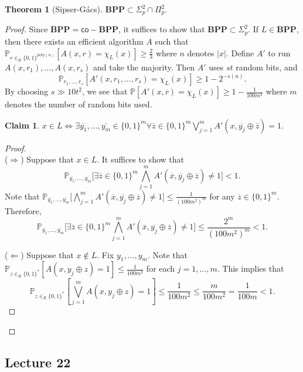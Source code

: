 \documentclass[10pt,letterpaper,cm]{nupset}
\theoremstyle{definition}
\theoremstyle{theorem}
\newtheorem{theorem}[definition]{Theorem}
\newtheorem*{claim}{Claim}
\theoremstyle{remark}
\newcommand{\1}{\mathbf{1}}
\newcommand{\0}{\vec 0}
\begin{document}
\begin{theorem}[Sipser-G\'acs]
$\mathbf{BPP} \subset \Sigma^2_p \cap \Pi^2_p$.
\end{theorem}
\begin{proof}
Since $\mathbf{BPP} = \mathsf{co}{-}\mathbf{BPP}$, it suffices to show that $\mathbf{BPP} \subset \Sigma^2_p$. If $L \in \mathbf{BPP}$, then there exists an efficient algorithm $A$ such that $\mathbb{P}_{r \in_R \{0,1\}^{\text{poly}(n)}}[A(x,r) = \chi_L(x)] \geq \frac{2}{3}$ where $n$ denotes $|x|$. Define $A'$ to run $A(x, r_1), \ldots, A(x, r_s)$ and take the majority. Then $A'$ uses $st$ random bits, and $$\mathbb{P}_{r_1, \ldots, r_s}[A'(x, r_1, \ldots, r_s) =\chi_L(x)] \geq 1 - 2^{{-}s(n)}.$$ By choosing $s \gg 10t^2$, we see that $\mathbb{P}[A'(x, \overline{r}) = \chi_L(x)] \geq 1 -\frac{1}{100m^2}$ where $m$ denotes the number of random bits used. 
\begin{claim}
$x \in L \iff \exists \overline{y_1}, \ldots, \overline{y_m} \in \{0,1\}^m \forall \overline{z} \in \{0,1\}^m \bigvee_{j=1}^m A'(x, \overline{y_j} \oplus \overline{z})=1$.
\end{claim}
\begin{proof} $ $
\\ ($\Longrightarrow$) Suppose that $x \in L$. It suffices to show that $$   \mathbb{P}_{\overline{y_1}, \ldots, \overline{y_m}} \big [\exists \overline{z} \in \{0,1\}^m \bigwedge_{j=1}^m A'(\overline{x}, \overline{y_j} \oplus \overline{z}) \ne 1 \big ] <1   .$$ Note that $\mathbb{P}_{\overline{y_1}, \ldots, \overline{y_m}} \big [\bigwedge_{j=1}^m  A'(\overline{x}, \overline{y_j} \oplus \overline{z}) \ne 1 \big  ] \leq \frac{1}{(100m^2)^m}$ for any $\overline{z} \in \{0,1\}^m$. Therefore, $$      \mathbb{P}_{\overline{y_1}, \ldots, \overline{y_m}} \big [\exists \overline{z} \in \{0,1\}^m \bigwedge_{j=1}^m A'(\overline{x}, \overline{y_j} \oplus \overline{z}) \ne 1 \big ]   \leq \frac{2^m}{(100m^2)^m} <1.$$

\medskip


($\Longleftarrow$)  Suppose that $x \notin L$. Fix $y_1, \ldots, y_m$. Note that $\mathbb{P}_{z \in_R \{0,1\}^{\ast}}[A(x, y_j \oplus z) =1] \leq \frac{1}{100m^2}$ for each $j=1, \ldots, m$. This implies that $$\mathbb{P}_{z \in_R \{0,1\}^{\ast}}[\bigvee_{j=1}^m A(x, y_j \oplus z) =1] \leq \frac{1}{100m^2} \leq \frac{m}{100m^2} = \frac{1}{100m} <1.$$
\end{proof}
\end{proof}

\subsection{Lecture 22}
\end{document}
